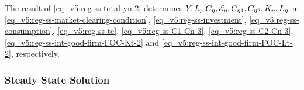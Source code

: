 \documentclass[../thesis.tex]{subfiles}
\begin{document}

	The result of \ref{eq_v5:reg-ss-total-yn-2} determines $Y, I_{\eta}, C_{\eta}, \te[],  C_{\eta 1}, C_{\eta 2}, K_{\eta}, L_{\eta}$ in \ref{eq_v5:reg-ss-market-clearing-condition}, \ref{eq_v5:reg-ss-investment}, \ref{eq_v5:reg-ss-consumption}, \ref{eq_v5:reg-ss-te},  \ref{eq_v5:reg-ss-C1-Cn-3}, \ref{eq_v5:reg-ss-C2-Cn-3}, \ref{eq_v5:reg-ss-int-good-firm-FOC-Kt-2} and \ref{eq_v5:reg-ss-int-good-firm-FOC-Lt-2}, respectively.


	
	
	\subsubsection{Steady State Solution}
	
	\vspace*{-1cm}
\end{document}

